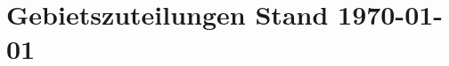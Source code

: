 \documentclass[10pt,twoside]{article}
\begin{document}
\section{Gebietszuteilungen Stand \today}
\begin{multicols*}{5}
\begin{footnotesize}

\end{footnotesize}
\end{multicols*}
\end{document}

